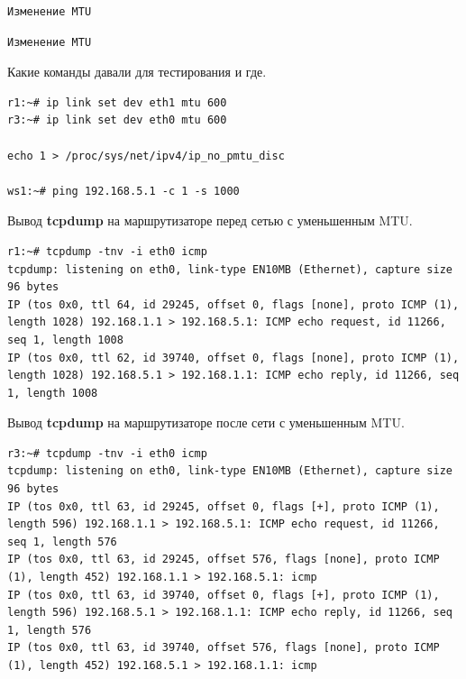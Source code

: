 \documentclass[a4paper,12pt]{article}
\begin{document}
\begin{Verbatim}
Изменение MTU
\end{Verbatim}

\begin{Verbatim}
Изменение MTU
\end{Verbatim}


Какие команды давали для тестирования и где.

\begin{Verbatim}
r1:~# ip link set dev eth1 mtu 600
r3:~# ip link set dev eth0 mtu 600

echo 1 > /proc/sys/net/ipv4/ip_no_pmtu_disc

ws1:~# ping 192.168.5.1 -c 1 -s 1000
\end{Verbatim}

Вывод \textbf{tcpdump} на маршрутизаторе перед сетью с уменьшенным MTU.


\begin{Verbatim}
r1:~# tcpdump -tnv -i eth0 icmp
tcpdump: listening on eth0, link-type EN10MB (Ethernet), capture size 96 bytes
IP (tos 0x0, ttl 64, id 29245, offset 0, flags [none], proto ICMP (1), length 1028) 192.168.1.1 > 192.168.5.1: ICMP echo request, id 11266, seq 1, length 1008
IP (tos 0x0, ttl 62, id 39740, offset 0, flags [none], proto ICMP (1), length 1028) 192.168.5.1 > 192.168.1.1: ICMP echo reply, id 11266, seq 1, length 1008
\end{Verbatim}

Вывод \textbf{tcpdump} на маршрутизаторе после сети с уменьшенным MTU.


\begin{Verbatim}
r3:~# tcpdump -tnv -i eth0 icmp
tcpdump: listening on eth0, link-type EN10MB (Ethernet), capture size 96 bytes
IP (tos 0x0, ttl 63, id 29245, offset 0, flags [+], proto ICMP (1), length 596) 192.168.1.1 > 192.168.5.1: ICMP echo request, id 11266, seq 1, length 576
IP (tos 0x0, ttl 63, id 29245, offset 576, flags [none], proto ICMP (1), length 452) 192.168.1.1 > 192.168.5.1: icmp
IP (tos 0x0, ttl 63, id 39740, offset 0, flags [+], proto ICMP (1), length 596) 192.168.5.1 > 192.168.1.1: ICMP echo reply, id 11266, seq 1, length 576
IP (tos 0x0, ttl 63, id 39740, offset 576, flags [none], proto ICMP (1), length 452) 192.168.5.1 > 192.168.1.1: icmp
\end{Verbatim}
\end{document}
